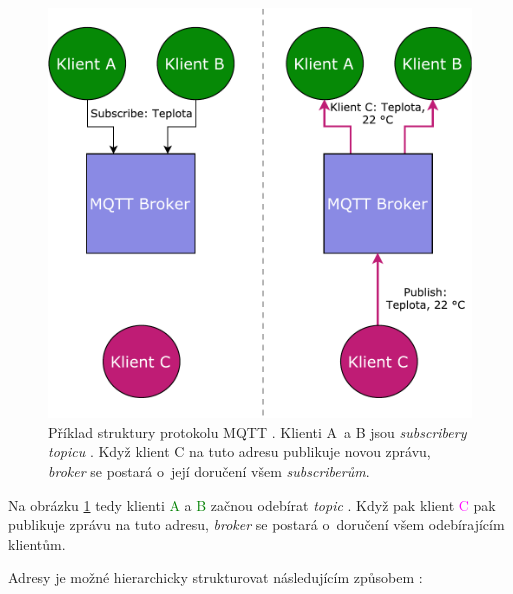 \begin{figure}[h!]
    \centering
    \includegraphics[width=\textwidth]{images/basic_mqtt.pdf}
    \caption[Příklad struktury protokolu MQTT]{Příklad struktury protokolu MQTT \cite{mqtt_eclipse}. Klienti A~a B jsou \textit{subscribery} \textit{topicu} . Když klient C na tuto adresu publikuje novou zprávu, \textit{broker} se postará o~její doručení všem \textit{subscriberům}.}
    \label{fig:basic_mqtt}
\end{figure}

Na obrázku \ref{fig:basic_mqtt} tedy klienti \textcolor{green}{A} a \textcolor{green}{B} začnou odebírat \textit{topic} . Když pak klient \textcolor{magenta}{C} pak publikuje zprávu na tuto adresu, \textcolor{blue2}{\textit{broker}} se postará o~doručení všem odebírajícím klientům.

Adresy je možné hierarchicky strukturovat následujícím způsobem \cite{mqtt_eclipse}: 

